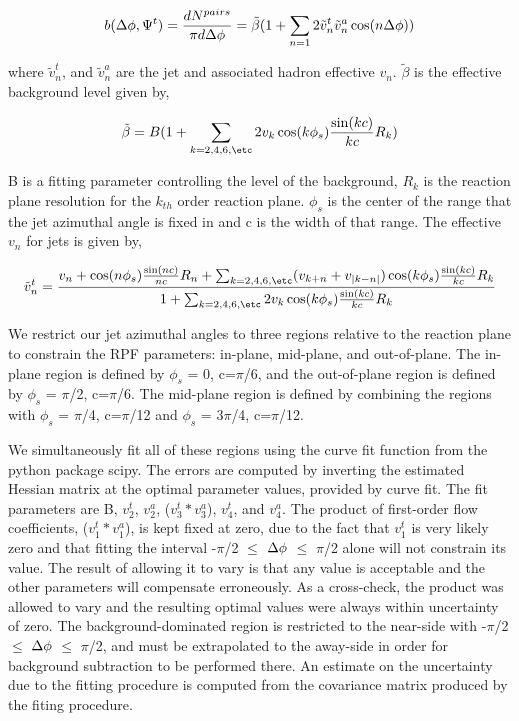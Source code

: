 \begin{equation}
    b(\Delta \phi, \Psi^t) = \frac{dN^{pairs}}{\pi d\Delta \phi} = \tilde{\beta}(1+\sum_{n=1} 2 \tilde{v}_n^t \tilde{v}_n^a \cos(n\Delta \phi))
\end{equation}

where $\tilde{v}_n^t$, and $\tilde{v}_n^a$ are the jet and associated hadron effective $v_n$. $\tilde{\beta}$ is the effective background level given by,

\begin{equation}
    \tilde{\beta} = B (1 + \sum_{k=2,4,6,\etc} 2 v_k \cos(k \phi_s) \frac{\sin(kc)}{kc} R_k)
\end{equation} 

B is a fitting parameter controlling the level of the background, $R_k$ is the reaction plane resolution for the $k_{th}$ order reaction plane. $\phi_s$ is the center of the range that the jet azimuthal angle is fixed in and c is the width of that range. The effective $v_n$ for jets is given by,

\begin{equation}
    \tilde{v}_n^t = \frac{v_n+ \cos(n \phi_s) \frac{\sin(nc)}{nc}R_n + \sum_{k=2,4,6,\etc} (v_{k+n} + v_{|k-n|}) \cos(k \phi_s) \frac{\sin(kc)}{kc} R_k}{1+ \sum_{k=2,4,6,\etc} 2 v_k \cos(k \phi_s) \frac{\sin(kc)}{kc} R_k}
\end{equation}

We restrict our jet azimuthal angles to three regions relative to the reaction plane to constrain the RPF parameters: in-plane, mid-plane, and out-of-plane. The in-plane region is defined by $\phi_s$ = 0, c=$\pi$/6, and the out-of-plane region is defined by $\phi_s$ = $\pi$/2, c=$\pi$/6. The mid-plane region is defined by combining the regions with $\phi_s$ = $\pi$/4, c=$\pi$/12 and $\phi_s$ = 3$\pi$/4, c=$\pi$/12. 

We simultaneously fit all of these regions using the curve fit function from the python package scipy. The errors are computed by inverting the estimated Hessian matrix at the optimal parameter values, provided by curve fit. The fit parameters are B, $v_2^t$, $v_2^a$, ($v_3^t * v_3^a$), $v_4^t$, and $v_4^a$. The product of first-order flow coefficients, ($v_1^t * v_1^a$), is kept fixed at zero, due to the fact that $v_1^t$ is very likely zero and that fitting the interval -$\pi$/2 $\leq$ $\Delta \phi$ $\leq$ $\pi$/2 alone will not constrain its value. The result of allowing it to vary is that any value is acceptable and the other parameters will compensate erroneously. As a cross-check, the product was allowed to vary and the resulting optimal values were always within uncertainty of zero. The background-dominated region is restricted to the near-side with -$\pi$/2 $\leq$ $\Delta \phi$ $\leq$ $\pi$/2, and must be extrapolated to the away-side in order for background subtraction to be performed there. An estimate on the uncertainty due to the fitting procedure is computed from the covariance matrix produced by the fiting procedure.

